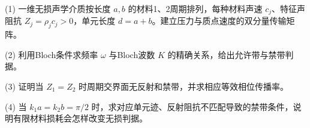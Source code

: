 (1) 一维无损声学介质按长度 \(a,b\) 的材料1、2周期排列，每种材料声速 \(c_j\)、特征声阻抗 \(Z_j=\rho_jc_j>0\)，单元长度 \(d=a+b\)。建立压力与质点速度的双分量传输矩阵。

(2) 利用Bloch条件求频率 \(\omega\) 与Bloch波数 \(K\) 的精确关系，给出允许带与禁带判据。

(3) 证明当 \(Z_1=Z_2\) 时周期交界面无反射和禁带，并求相应等效相位传播率。

(4) 当 \(k_1a=k_2b=\pi/2\) 时，求对应单元迹、反射阻抗不匹配导致的禁带条件，说明有限材料损耗会怎样改变无损判据。
